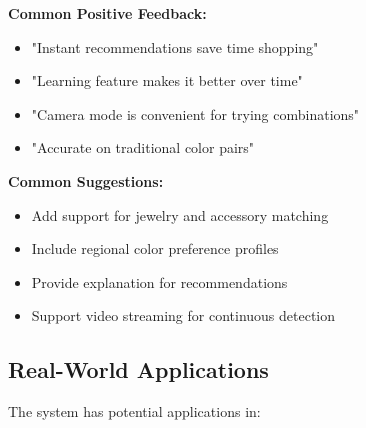 \documentclass[12pt,a4paper]{report}
\begin{document}
\textbf{Common Positive Feedback:}
\begin{itemize}
    \item "Instant recommendations save time shopping"
    \item "Learning feature makes it better over time"
    \item "Camera mode is convenient for trying combinations"
    \item "Accurate on traditional color pairs"
\end{itemize}

\textbf{Common Suggestions:}
\begin{itemize}
    \item Add support for jewelry and accessory matching
    \item Include regional color preference profiles
    \item Provide explanation for recommendations
    \item Support video streaming for continuous detection
\end{itemize}

\subsection{Real-World Applications}

The system has potential applications in:
\end{document}
